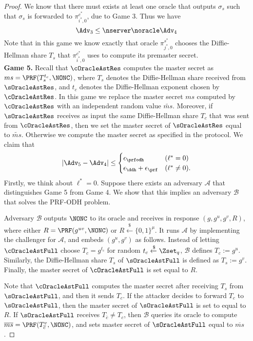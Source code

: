 \begin{proof}
 We know that there must exists at least one oracle that outputs $\sigma_s$ such that $\sigma_s$ is forwarded to $\pi^{c^{\ast}}_{i^{\ast},0}$, due to Game 3. Thus we have
 \begin{equation}
  \Adv_3 \leq \nserver \noracle \Adv_4
 \end{equation}%
 Note that in this game we know exactly that oracle $\pi^{s^{\ast}}_{j^{\ast},0}$ chooses the Diffie-Hellman share $T_s$ that $\pi^{c^{\ast}}_{i^{\ast},0}$ uses to compute its premaster secret.
 \vspace{10pt}\\
%
%
 \textbf{Game 5.} Recall that $\cOracleAstRes$ computes the master secret as $ms = \PRF(T_s^{t_c}, \NONC)$, where $T_s$ denotes the Diffie-Hellman share received from $\sOracleAstRes$, and $t_c$ denotes the Diffie-Hellman exponent chosen by $\cOracleAstRes$. In this game we replace the master secret $ms$ computed by $\cOracleAstRes$ with an independent random value $\widetilde{ms}$. Moreover, if $\sOracleAstRes$ receives as input the same Diffie-Hellman share $T_c$ that was sent from $\cOracleAstRes$, then we set the master secret of $\sOracleAstRes$ equal to $\widetilde{ms}$. Otherwise we compute the master secret as specified in the protocol. We claim that
 \begin{equation}
  |\Adv_5 - \Adv_4| \leq
  \begin{cases}
   \epsilon_{\prfodh} & (\ell^{\ast} = 0) \\
   \epsilon_{\ddh} + \epsilon_{\prf} & (\ell^{\ast} \neq 0).
  \end{cases}
 \end{equation}%
 Firstly, we think about $\ell^{\ast} = 0$.
 Suppose there exists an adversary $\mathcal{A}$ that distinguishes Game 5 from Game 4. We show that this implies an adversary $\mathcal{B}$ that solves the PRF-ODH problem.

 Adversary $\mathcal{B}$ outputs $\NONC$ to its oracle and receives in response $(g,g^u,g^v,R)$, where either $R = \PRF(g^{uv},\NONC)$ or $R \xleftarrow{\$} \{0,1\}^{\mu}$. It runs $\mathcal{A}$ by implementing the challenger for $\mathcal{A}$, and embeds $(g^u,g^v)$ as follows. Instead of letting $\cOracleAstFull$ choose $T_c = g^{t_c}$ for random $t_c \xleftarrow{\$} \Zset_{q}$, $\mathcal{B}$ defines $T_c := g^u$. Similarly, the Diffie-Hellman share $T_s$ of $\sOracleAstFull$ is defined as $T_s := g^v$. Finally, the master secret of $\cOracleAstFull$ is set equal to $R$.

 Note that $\cOracleAstFull$ computes the master secret after receiving $T_s$ from $\sOracleAstFull$, and then it sends $T_c$. If the attacker decides to forward $T_c$ to $\sOracleAstFull$, then the master secret of $\sOracleAstFull$ is set to equal to $R$. If $\sOracleAstFull$ receives $T_{\overline{c}} \neq T_c$, then $\mathcal{B}$ queries its oracle to compute $\overline{ms} = \PRF(T_{\overline{c}}^v,\NONC)$, and sets master secret of $\sOracleAstFull$ equal to $\overline{ms}$.


\end{proof}
